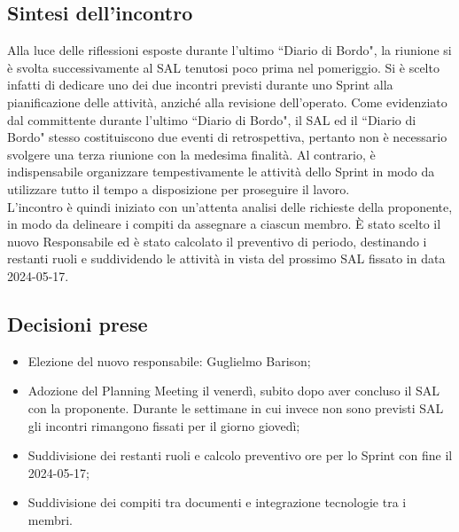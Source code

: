 \documentclass[8pt]{article}
\begin{document}
\subsection{Sintesi dell'incontro}
Alla luce delle riflessioni esposte durante l'ultimo ``Diario di Bordo", la riunione si è svolta successivamente al SAL tenutosi poco prima nel pomeriggio. Si è scelto infatti di dedicare uno dei due incontri previsti durante uno Sprint alla pianificazione delle attività, anziché alla revisione dell'operato. Come evidenziato dal committente durante l'ultimo ``Diario di Bordo", il SAL ed il ``Diario di Bordo" stesso costituiscono due eventi di retrospettiva, pertanto non è necessario svolgere una terza riunione con la medesima finalità. Al contrario, è indispensabile organizzare tempestivamente le attività dello Sprint in modo da utilizzare tutto il tempo a disposizione per proseguire il lavoro. \\
L'incontro è quindi iniziato con un'attenta analisi delle richieste della proponente, in modo da delineare i compiti da assegnare a ciascun membro. È stato scelto il nuovo Responsabile ed è stato calcolato il preventivo di periodo, destinando i restanti ruoli e suddividendo le attività in vista del prossimo SAL fissato in data 2024-05-17.

\subsection{Decisioni prese}
\begin{itemize}
	\setlength\itemsep{0em}
	\item Elezione del nuovo responsabile: Guglielmo Barison;
        \item Adozione del Planning Meeting il venerdì, subito dopo aver concluso il SAL con la proponente. Durante le settimane in cui invece non sono previsti SAL gli incontri rimangono fissati per il giorno giovedì;
	\item Suddivisione dei restanti ruoli e calcolo preventivo ore per lo Sprint con fine il 2024-05-17;
	\item Suddivisione dei compiti tra documenti e integrazione tecnologie tra i membri.
\end{itemize}
\newpage
\end{document}
